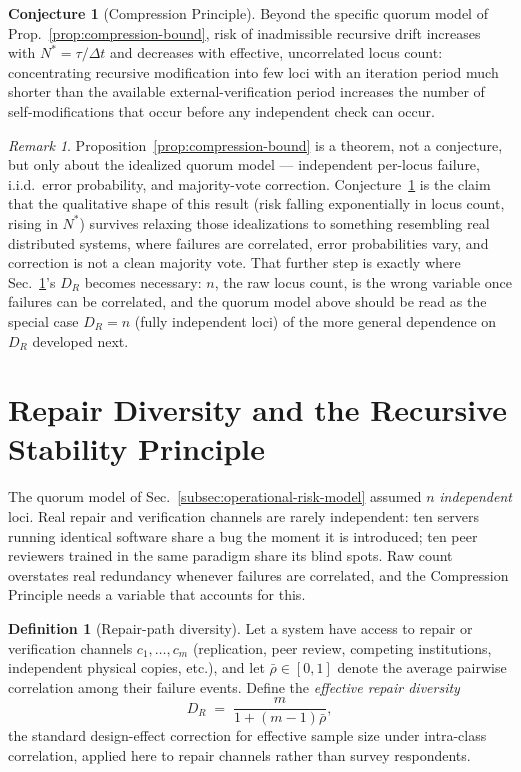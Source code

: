 \documentclass[12pt,a4paper]{article}
\theoremstyle{plain}
\theoremstyle{definition}
\newtheorem{definition}[theorem]{Definition}
\newtheorem{conjecture}[theorem]{Conjecture}
\theoremstyle{remark}
\newtheorem{remark}[theorem]{Remark}
\newcommand{\DR}{D_R}
\begin{document}
\begin{conjecture}[Compression Principle]
\label{conj:compression}
Beyond the specific quorum model of Prop.~\ref{prop:compression-bound}, risk of inadmissible recursive drift increases with $N^\ast = \tau/\Delta t$ and decreases with effective, uncorrelated locus count: concentrating recursive modification into few loci with an iteration period much shorter than the available external-verification period increases the number of self-modifications that occur before any independent check can occur.
\end{conjecture}

\begin{remark}
Proposition~\ref{prop:compression-bound} is a theorem, not a conjecture, but only about the idealized quorum model — independent per-locus failure, i.i.d.\ error probability, and majority-vote correction. Conjecture~\ref{conj:compression} is the claim that the qualitative shape of this result (risk falling exponentially in locus count, rising in $N^\ast$) survives relaxing those idealizations to something resembling real distributed systems, where failures are correlated, error probabilities vary, and correction is not a clean majority vote. That further step is exactly where Sec.~\ref{sec:repair-diversity}'s $\DR$ becomes necessary: $n$, the raw locus count, is the wrong variable once failures can be correlated, and the quorum model above should be read as the special case $\DR = n$ (fully independent loci) of the more general dependence on $\DR$ developed next.
\end{remark}

\section{Repair Diversity and the Recursive Stability Principle}
\label{sec:repair-diversity}

The quorum model of Sec.~\ref{subsec:operational-risk-model} assumed $n$ \emph{independent} loci. Real repair and verification channels are rarely independent: ten servers running identical software share a bug the moment it is introduced; ten peer reviewers trained in the same paradigm share its blind spots. Raw count overstates real redundancy whenever failures are correlated, and the Compression Principle needs a variable that accounts for this.

\begin{definition}[Repair-path diversity]
\label{def:repair-diversity}
Let a system have access to repair or verification channels $c_1,\ldots,c_m$ (replication, peer review, competing institutions, independent physical copies, etc.), and let $\bar\rho \in [0,1]$ denote the average pairwise correlation among their failure events. Define the \emph{effective repair diversity}
\[
\DR \;=\; \frac{m}{1 + (m-1)\bar\rho},
\]
the standard design-effect correction for effective sample size under intra-class correlation, applied here to repair channels rather than survey respondents.
\end{definition}
\end{document}
